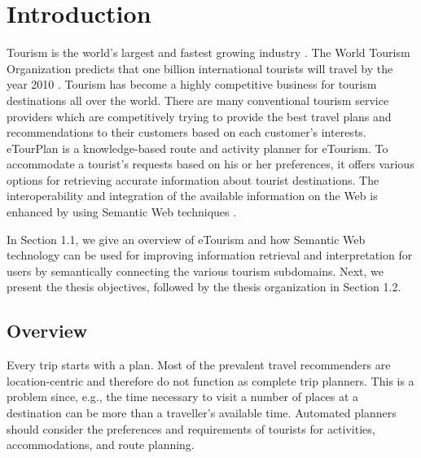 \chapter{Introduction}
 
\hspace{0.3in}
Tourism is the world's largest and fastest growing industry \cite{BS:01}. The World Tourism Organization predicts that one billion international tourists will travel by the year 2010 \cite{acm:04}. Tourism has become a highly competitive business for tourism destinations all over the world. There are many conventional tourism service providers which are competitively trying to provide the best travel plans and recommendations to their customers based on each customer's interests. eTourPlan is a knowledge-based route and activity planner for eTourism. To accommodate a tourist's requests based on his or her preferences, it offers various options for retrieving accurate information about tourist destinations. The interoperability and integration of the available information on the Web is enhanced by using Semantic Web techniques \cite{AS:02}\cite{YB2:08}. 

\hspace{0.3in}In Section 1.1, we give an overview of eTourism and how Semantic Web technology can be used for improving information retrieval and interpretation for users by semantically connecting the various tourism subdomains. Next, we present the thesis objectives, followed by the thesis organization in Section 1.2.


\section{Overview}
\hspace{0.3in} Every trip starts with a plan. Most of the prevalent travel recommenders \cite{FR:02}\cite{DBLP:08}\cite{AJ:05} are location-centric and therefore do not function as complete trip planners. This is a problem since, e.g., the time necessary to visit a number of places at a destination can be more than a traveller's available time. Automated planners should consider the preferences and requirements of tourists for activities, accommodations, and route planning. 

